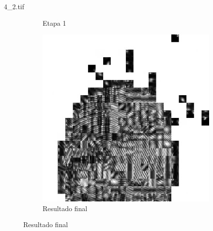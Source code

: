 \documentclass{beamer}
\begin{document}
\begin{frame}{4\_2.tif}
\begin{figure}
\begin{subfigure}[!ht]{0.32\textwidth}
                \caption{Etapa 1}
            \end{subfigure}
            \begin{subfigure}[!ht]{0.32\textwidth}
                \includegraphics[width=\columnwidth]{Fingerprints/4_2_final.jpg}
                \caption{Resultado final}
            \end{subfigure}
        \end{figure}
    \end{frame}
\end{document}

